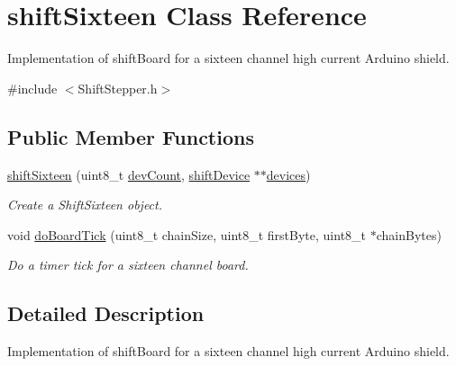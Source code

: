\hypertarget{classshift_sixteen}{
\section{shiftSixteen Class Reference}
\label{classshift_sixteen}
}


Implementation of shiftBoard for a sixteen channel high current Arduino shield.  




{\ttfamily \#include $<$ShiftStepper.h$>$}

\subsection*{Public Member Functions}
\begin{DoxyCompactItemize}
\item 
\hyperlink{classshift_sixteen_afb8981ea1869387ca6e5b4c2a28b8018}{shiftSixteen} (uint8\_\-t \hyperlink{_shift_stepper_8h_adf507bdc7510cde5b562b4838bcb2a9f}{devCount}, \hyperlink{classshift_device}{shiftDevice} $\ast$$\ast$\hyperlink{_shift_stepper_8h_ae69cffa41bbed7173c4796af281252ce}{devices})
\begin{DoxyCompactList}\small\item\em Create a ShiftSixteen object. \item\end{DoxyCompactList}\item 
void \hyperlink{classshift_sixteen_a28c2a73078d10abf6f779021fd8d2908}{doBoardTick} (uint8\_\-t chainSize, uint8\_\-t firstByte, uint8\_\-t $\ast$chainBytes)
\begin{DoxyCompactList}\small\item\em Do a timer tick for a sixteen channel board. \item\end{DoxyCompactList}\end{DoxyCompactItemize}


\subsection{Detailed Description}
Implementation of shiftBoard for a sixteen channel high current Arduino shield. 

